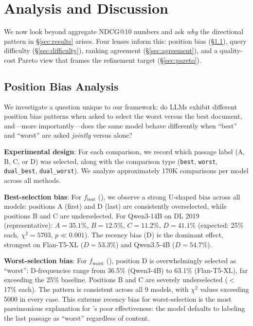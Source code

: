 \section{Analysis and Discussion}
\label{sec:analysis}

We now look beyond aggregate NDCG@10 numbers and ask \emph{why} the directional pattern in \S\ref{sec:results} arises. Four lenses inform this: position bias (\S\ref{sec:bias}), query difficulty (\S\ref{sec:difficulty}), ranking agreement (\S\ref{sec:agreement}), and a quality-cost Pareto view that frames the refinement target (\S\ref{sec:pareto}).

\subsection{Position Bias Analysis}
\label{sec:bias}

We investigate a question unique to our framework: do LLMs exhibit different position bias patterns when asked to select the worst versus the best document, and---more importantly---does the same model behave differently when ``best'' and ``worst'' are asked \emph{jointly} versus alone?

\textbf{Experimental design}: For each comparison, we record which passage label (A, B, C, or D) was selected, along with the comparison type (\texttt{best}, \texttt{worst}, \texttt{dual\_best}, \texttt{dual\_worst}). We analyze approximately 170K comparisons per model across all methods.

\textbf{Best-selection bias}: For $f_{\text{best}}$ (\topdown{}), we observe a strong U-shaped bias across all models: positions A (first) and D (last) are consistently overselected, while positions B and C are underselected. For Qwen3-14B on DL 2019 (representative): $A=35.1\%$, $B=12.5\%$, $C=11.2\%$, $D=41.1\%$ (expected: 25\% each, $\chi^2{=}5703$, $p \ll 0.001$). The recency bias (D) is the dominant effect, strongest on Flan-T5-XL ($D=53.3\%$) and Qwen3.5-4B ($D=54.7\%$).

\textbf{Worst-selection bias}: For $f_{\text{worst}}$ (\bottomup{}), position D is overwhelmingly selected as ``worst'': D-frequencies range from 36.5\% (Qwen3-4B) to 63.1\% (Flan-T5-XL), far exceeding the 25\% baseline. Positions B and C are severely underselected ($<$17\% each). The pattern is consistent across all 9 models, with $\chi^2$ values exceeding 5000 in every case. This extreme recency bias for worst-selection is the most parsimonious explanation for \bottomup{}'s poor effectiveness: the model defaults to labeling the last passage as ``worst'' regardless of content.

